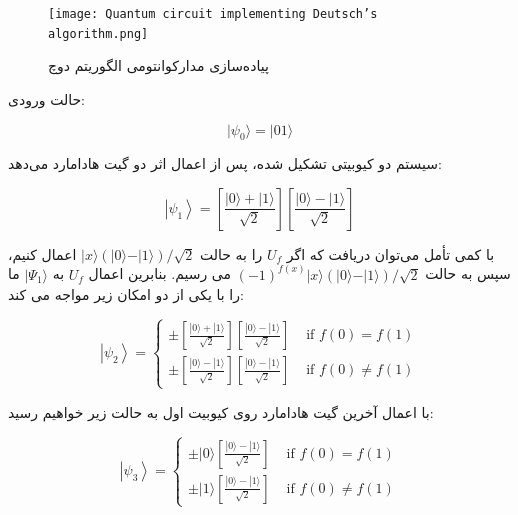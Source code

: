 \documentclass{book}
\begin{document}
\begin{figure}[ht]
	\centering
	\texttt{[image: Quantum circuit implementing Deutsch’s algorithm.png]}
	\caption{پیاده‌سازی مدارکوانتومی‌ الگوریتم دوچ}
\end{figure}
حالت ورودی:\\
\begin{center}
	\begin{equation}\label{zero state deutsch}
		\vert\psi_{0}\rangle = \vert01\rangle
	\end{equation}
\end{center}

سیستم دو کیوبیتی تشکیل شده،‌ پس از اعمال اثر دو گیت هادامارد می‌دهد:\\

\begin{center}
	\begin{equation}\label{first psi1 deutsch algorithm}
		\left|\psi_1\right\rangle=\left[\frac{|0\rangle+|1\rangle}{\sqrt{2}}\right]\left[\frac{|0\rangle-|1\rangle}{\sqrt{2}}\right]
	\end{equation}
\end{center}
با کمی تأمل می‌توان دریافت که اگر $U_{f}$ را به حالت $\vert x \rangle (\vert 0 \rangle - \vert 1 \rangle)/\sqrt{2}$ اعمال کنیم، سپس به حالت $(-1)^{f(x)}\vert x \rangle(\vert 0 \rangle - \vert 1 \rangle)/\sqrt{2}$ می رسیم. بنابرین اعمال $U_{f}$ به $\vert \Psi_{1} \rangle$ ما را با یکی از دو امکان زیر مواجه می کند:
\begin{center}
	\begin{equation}\label{first psi2 deutsch algorithm}
	\left|\psi_2\right\rangle= \begin{cases} \pm\left[\frac{|0\rangle+|1\rangle}{\sqrt{2}}\right]\left[\frac{|0\rangle-|1\rangle}{\sqrt{2}}\right] & \text { if } f(0)=f(1) \\ \pm\left[\frac{|0\rangle-|1\rangle}{\sqrt{2}}\right]\left[\frac{|0\rangle-|1\rangle}{\sqrt{2}}\right] & \text { if } f(0) \neq f(1) \end{cases}
\end{equation}
\end{center}
با اعمال آخرین گیت هادامارد روی کیوبیت اول به حالت زیر خواهیم رسید:
\begin{center}
	\begin{equation}\label{first psi3 deutsch algorithm}
	\left|\psi_3\right\rangle= \begin{cases} \pm|0\rangle\left[\frac{|0\rangle-|1\rangle}{\sqrt{2}}\right] & \text { if } f(0)=f(1) \\ \pm|1\rangle\left[\frac{|0\rangle-|1\rangle}{\sqrt{2}}\right] & \text { if } f(0) \neq f(1) \end{cases}
	\end{equation}
\end{center}
\end{document}
